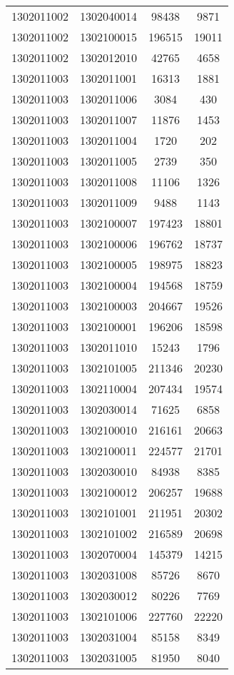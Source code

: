 \begin{longtable}{llcc}
1302011002 & 1302040014 & 98438 & 9871\\
1302011002 & 1302100015 & 196515 & 19011\\
1302011002 & 1302012010 & 42765 & 4658\\
1302011003 & 1302011001 & 16313 & 1881\\
1302011003 & 1302011006 & 3084 & 430\\
1302011003 & 1302011007 & 11876 & 1453\\
1302011003 & 1302011004 & 1720 & 202\\
1302011003 & 1302011005 & 2739 & 350\\
1302011003 & 1302011008 & 11106 & 1326\\
1302011003 & 1302011009 & 9488 & 1143\\
1302011003 & 1302100007 & 197423 & 18801\\
1302011003 & 1302100006 & 196762 & 18737\\
1302011003 & 1302100005 & 198975 & 18823\\
1302011003 & 1302100004 & 194568 & 18759\\
1302011003 & 1302100003 & 204667 & 19526\\
1302011003 & 1302100001 & 196206 & 18598\\
1302011003 & 1302011010 & 15243 & 1796\\
1302011003 & 1302101005 & 211346 & 20230\\
1302011003 & 1302110004 & 207434 & 19574\\
1302011003 & 1302030014 & 71625 & 6858\\
1302011003 & 1302100010 & 216161 & 20663\\
1302011003 & 1302100011 & 224577 & 21701\\
1302011003 & 1302030010 & 84938 & 8385\\
1302011003 & 1302100012 & 206257 & 19688\\
1302011003 & 1302101001 & 211951 & 20302\\
1302011003 & 1302101002 & 216589 & 20698\\
1302011003 & 1302070004 & 145379 & 14215\\
1302011003 & 1302031008 & 85726 & 8670\\
1302011003 & 1302030012 & 80226 & 7769\\
1302011003 & 1302101006 & 227760 & 22220\\
1302011003 & 1302031004 & 85158 & 8349\\
1302011003 & 1302031005 & 81950 & 8040\\

\end{longtable}
